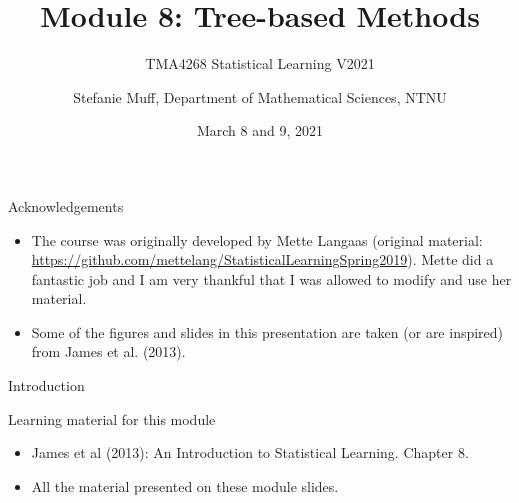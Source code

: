 \documentclass[10pt,ignorenonframetext,]{beamer}
\title{Module 8: Tree-based Methods}
\subtitle{TMA4268 Statistical Learning V2021}
\author{Stefanie Muff, Department of Mathematical Sciences, NTNU}
\date{March 8 and 9, 2021}
\providecommand{\tightlist}{%
  \setlength{\itemsep}{0pt}\setlength{\parskip}{0pt}}
\begin{document}
\frame{\titlepage}

\begin{frame}{Acknowledgements}
\protect\hypertarget{acknowledgements}{}

\begin{itemize}
\item
  The course was originally developed by Mette Langaas (original
  material:
  \url{https://github.com/mettelang/StatisticalLearningSpring2019}).
  Mette did a fantastic job and I am very thankful that I was allowed to
  modify and use her material.
\item
  Some of the figures and slides in this presentation are taken (or are
  inspired) from James et al. (2013).
\end{itemize}

\end{frame}

\begin{frame}{Introduction}
\protect\hypertarget{introduction}{}

\begin{block}{Learning material for this module}

\vspace{2mm}

\begin{itemize}
\tightlist
\item
  James et al (2013): An Introduction to Statistical Learning. Chapter
  8.\\
\item
  All the material presented on these module slides.
\end{itemize}

\end{block}

\end{frame}
\end{document}
